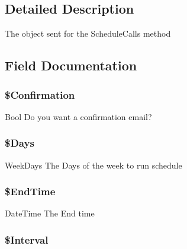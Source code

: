 \subsection{Detailed Description}
The object sent for the Schedule\-Calls method 

\subsection{Field Documentation}
\hypertarget{class_schedule_calls_request_of_int32_afcd9214c7e03e9e066611fb7ee041fb9}{
\subsubsection[{\$\-Confirmation}]{\setlength{\rightskip}{0pt plus 5cm}\$Confirmation}}\label{class_schedule_calls_request_of_int32_afcd9214c7e03e9e066611fb7ee041fb9}
Bool Do you want a confirmation email? \hypertarget{class_schedule_calls_request_of_int32_a541b96a58d5cadab10a165a562fc066e}{
\subsubsection[{\$\-Days}]{\setlength{\rightskip}{0pt plus 5cm}\$Days}}\label{class_schedule_calls_request_of_int32_a541b96a58d5cadab10a165a562fc066e}
Week\-Days The Days of the week to run schedule \hypertarget{class_schedule_calls_request_of_int32_ab7205c64d4caf57ad5c439d161116d8e}{
\subsubsection[{\$\-End\-Time}]{\setlength{\rightskip}{0pt plus 5cm}\$End\-Time}}\label{class_schedule_calls_request_of_int32_ab7205c64d4caf57ad5c439d161116d8e}
Date\-Time The End time \hypertarget{class_schedule_calls_request_of_int32_a06a0c2a526e2a41abe73b0ffdf2932ee}{
\subsubsection[{\$\-Interval}]{\setlength{\rightskip}{0pt plus 5cm}\$Interval}}\label{class_schedule_calls_request_of_int32_a06a0c2a526e2a41abe73b0ffdf2932ee}
